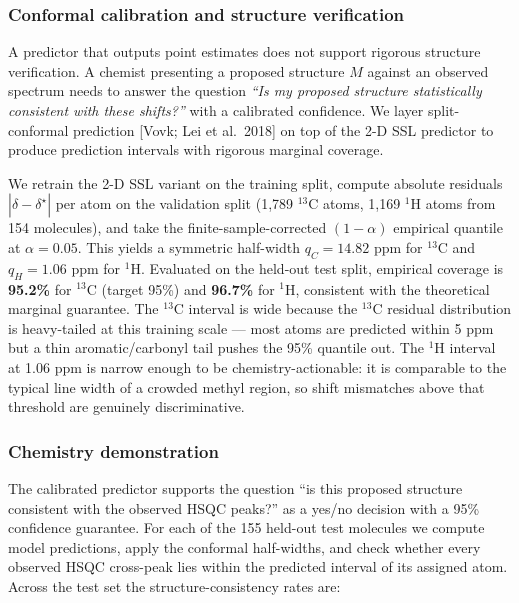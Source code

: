\subsubsection{Conformal calibration and structure verification}\label{conformal-calibration-and-structure-verification}

A predictor that outputs point estimates does not support rigorous structure verification. A chemist presenting a proposed structure \(M\) against an observed spectrum needs to answer the question \emph{``Is my proposed structure statistically consistent with these shifts?''} with a calibrated confidence. We layer split-conformal prediction {[}Vovk; Lei et al.~2018{]} on top of the 2-D SSL predictor to produce prediction intervals with rigorous marginal coverage.

We retrain the 2-D SSL variant on the training split, compute absolute residuals \(|\hat{\delta} - \delta^\star|\) per atom on the validation split (1,789 \(^{13}\)C atoms, 1,169 \(^{1}\)H atoms from 154 molecules), and take the finite-sample-corrected \((1-\alpha)\) empirical quantile at \(\alpha = 0.05\). This yields a symmetric half-width \(q_C = 14.82\) ppm for \(^{13}\)C and \(q_H = 1.06\) ppm for \(^{1}\)H. Evaluated on the held-out test split, empirical coverage is \textbf{95.2\%} for \(^{13}\)C (target 95\%) and \textbf{96.7\%} for \(^{1}\)H, consistent with the theoretical marginal guarantee. The \(^{13}\)C interval is wide because the \(^{13}\)C residual distribution is heavy-tailed at this training scale --- most atoms are predicted within 5 ppm but a thin aromatic/carbonyl tail pushes the 95\% quantile out. The \(^{1}\)H interval at 1.06 ppm is narrow enough to be chemistry-actionable: it is comparable to the typical line width of a crowded methyl region, so shift mismatches above that threshold are genuinely discriminative.

\subsubsection{Chemistry demonstration}\label{chemistry-demonstration}

The calibrated predictor supports the question ``is this proposed structure consistent with the observed HSQC peaks?'' as a yes/no decision with a 95\% confidence guarantee. For each of the 155 held-out test molecules we compute model predictions, apply the conformal half-widths, and check whether every observed HSQC cross-peak lies within the predicted interval of its assigned atom. Across the test set the structure-consistency rates are:

